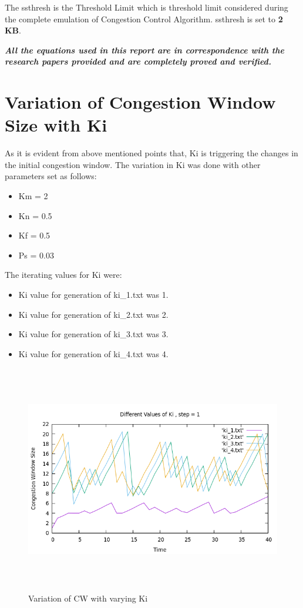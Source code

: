 \documentclass[12pt]{article}
\begin{document}
The ssthresh is the Threshold Limit which is threshold limit considered during the complete emulation of Congestion Control Algorithm. ssthresh is set to \textbf{2 KB}.

\textbf{\textit{All the equations used in this report are in correspondence with the research papers provided and are completely proved and verified.}}


\section{Variation of Congestion Window Size with Ki}
As it is evident from above mentioned points that, Ki is triggering the changes in the initial congestion window.
The variation in Ki was done with other parameters set as follows:
\begin{itemize}
    \item Km = 2
    \item Kn = 0.5
    \item Kf = 0.5
    \item Ps = 0.03
    
\end{itemize}

The iterating values for Ki were:
\begin{itemize}
    \item Ki value for generation of ki\_1.txt was 1.
    \item Ki value for generation of ki\_2.txt was 2.
    \item Ki value for generation of ki\_3.txt was 3.
    \item Ki value for generation of ki\_4.txt was 4.
\end{itemize}

\begin{figure}
    \centering
    \includegraphics[width=15cm, height=10cm]{ki.png}
    \caption{Variation of CW with varying Ki}
\end{figure}
\end{document}
